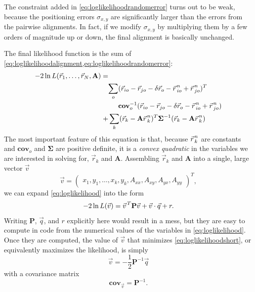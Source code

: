 \documentclass{article}
\newcommand{\svec}[1]{{\vec{#1}\mkern2mu\vphantom{#1}}}
\newcommand{\matrixbold}[1]{\mathbf{#1}}
\begin{document}
The constraint added in \cref{eq:loglikelihoodrandomerror} turns out to be weak, because the positioning errors $\sigma_{x,y}$ are significantly larger than the errors from the pairwise alignments.  In fact, if we modify $\sigma_{x,y}$ by multiplying them by a few orders of magnitude up or down, the final alignment is basically unchanged.

The final likelihood function is the sum of \cref{eq:loglikelihoodalignment,eq:loglikelihoodrandomerror}:
\begin{align}
\begin{aligned}
-2\ln L(\vec{r}_1, \ldots, \vec{r}_N, \matrixbold{A})=&\\
&
\begin{aligned}
\sum_{o}&(\vec{r}_{io} - \vec{r}_{jo} - \delta\vec{r}_o - \svec{r}_{io}^n + \svec{r}_{jo}^n)^T \\
&\matrixbold{cov}_o^{-1}
(\vec{r}_{io} - \vec{r}_{jo} - \delta\vec{r}_o - \svec{r}_{io}^n + \svec{r}_{jo}^n) \\
\end{aligned} \\
+&\sum_{k}(\vec{r}_{k} - \matrixbold{A}\svec{r}_{k}^n)^T %
\matrixbold{\Sigma}^{-1}
(\vec{r}_{k} - \matrixbold{A}\svec{r}_{k}^n)
\label{eq:loglikelihood}
\end{aligned}
\end{align}
The most important feature of this equation is that, because $\svec{r}_k^n$ are constants and $\matrixbold{cov}_o$ and $\matrixbold{\Sigma}$ are positive definite, it is a \emph{convex quadratic} in the variables we are interested in solving for, $\vec{r}_k$ and $\matrixbold{A}$.  Assembling $\vec{r}_k$ and $\matrixbold{A}$ into a single, large vector $\vec{v}$
\begin{equation}
\vec{v}=\begin{pmatrix}
x_1,
y_1,
\ldots,
x_k,
y_k,
A_{xx},
A_{xy},
A_{yx},
A_{yy}
\end{pmatrix}^T,
\end{equation}
we can expand \cref{eq:loglikelihood} into the form
\begin{equation}
-2\ln L(\vec{v})=\svec{v}^T\matrixbold{P}\vec{v} + \vec{v}\cdot\vec{q} + r.
\label{eq:loglikelihoodshort}
\end{equation}
Writing $\matrixbold{P}$, $\vec{q}$, and $r$ explicitly here would result in a mess, but they are easy to compute in code from the numerical values of the variables in \cref{eq:loglikelihood}.  Once they are computed, the value of $\vec{v}$ that minimizes \cref{eq:loglikelihoodshort}, or equivalently maximizes the likelihood, is simply
\begin{equation}
\vec{v}=-\frac{1}{2}\matrixbold{P}^{-1}\vec{q}
\end{equation}
with a covariance matrix
\begin{equation}
\matrixbold{cov}_{\vec{v}}=\matrixbold{P}^{-1}.
\end{equation}
\end{document}
